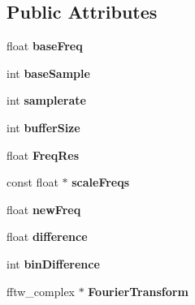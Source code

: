 \subsection*{Public Attributes}
\begin{DoxyCompactItemize}
\item 
\hypertarget{classvocoder_aafcdc7b5f6784b3b55f7c964211c1329}{float {\bfseries base\-Freq}}\label{classvocoder_aafcdc7b5f6784b3b55f7c964211c1329}

\item 
\hypertarget{classvocoder_ab5c7dbce120b438d5a3f60771e8b359e}{int {\bfseries base\-Sample}}\label{classvocoder_ab5c7dbce120b438d5a3f60771e8b359e}

\item 
\hypertarget{classvocoder_a1cc2c8e543b6bdcb79634bff13bf23fd}{int {\bfseries samplerate}}\label{classvocoder_a1cc2c8e543b6bdcb79634bff13bf23fd}

\item 
\hypertarget{classvocoder_a33f8486a4d2962a9f28a855cb7a55e5d}{int {\bfseries buffer\-Size}}\label{classvocoder_a33f8486a4d2962a9f28a855cb7a55e5d}

\item 
\hypertarget{classvocoder_a7e4963de3417d77dd67b5d2d4098b4bf}{float {\bfseries Freq\-Res}}\label{classvocoder_a7e4963de3417d77dd67b5d2d4098b4bf}

\item 
\hypertarget{classvocoder_a67c10ca912065a25364f43ecfd5a7706}{const float $\ast$ {\bfseries scale\-Freqs}}\label{classvocoder_a67c10ca912065a25364f43ecfd5a7706}

\item 
\hypertarget{classvocoder_aeb2b2f60f0f665a0ada7432a698e8cbb}{float {\bfseries new\-Freq}}\label{classvocoder_aeb2b2f60f0f665a0ada7432a698e8cbb}

\item 
\hypertarget{classvocoder_a3e465de83503fc072b5877cc370b9158}{float {\bfseries difference}}\label{classvocoder_a3e465de83503fc072b5877cc370b9158}

\item 
\hypertarget{classvocoder_ae82a9e8adea02301434f03ac01c61720}{int {\bfseries bin\-Difference}}\label{classvocoder_ae82a9e8adea02301434f03ac01c61720}

\item 
\hypertarget{classvocoder_ac249f700b1708bf7cd07e01b705a2426}{fftw\-\_\-complex $\ast$ {\bfseries Fourier\-Transform}}\label{classvocoder_ac249f700b1708bf7cd07e01b705a2426}


\end{DoxyCompactItemize}

